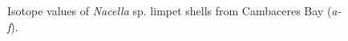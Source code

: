\documentclass[
  authoryear,
  preprint,
  3p]{elsarticle}
\begin{document}
\begin{figure}


\caption{\label{fig-Nac_iso}Isotope values of \emph{Nacella} sp. limpet
shells from Cambaceres Bay (\emph{a-f}).}

\end{figure}%
\end{document}
